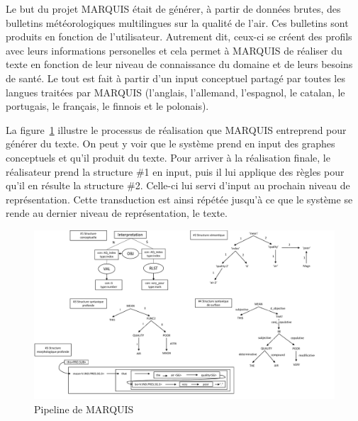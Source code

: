 Le but du projet MARQUIS était de générer, à partir de données brutes, des bulletins météorologiques multilingues sur la qualité de l'air. Ces bulletins sont produits en fonction de l'utilisateur. Autrement dit, ceux-ci se créent des profils avec leurs informations personelles et cela permet à MARQUIS de réaliser du texte en fonction de leur niveau de connaissance du domaine et de leurs besoins de santé. Le tout est fait à partir d'un input conceptuel partagé par toutes les langues traitées par MARQUIS (l'anglais, l'allemand, l'espagnol, le catalan, le portugais, le français, le finnois et le polonais). 

La figure~\ref{fig:marquis} illustre le processus de réalisation que MARQUIS entreprend pour générer du texte. On peut y voir que le système prend en input des graphes conceptuels et qu'il produit du texte. Pour arriver à la réalisation finale, le réalisateur prend la structure \#1 en input, puis il lui applique des règles pour qu'il en résulte la structure \#2. Celle-ci lui servi d'input au prochain niveau de représentation. Cette transduction est ainsi répétée jusqu'à ce que le système se rende au dernier niveau de représentation, le texte.

\begin{figure}[htb]
	\centering
	\includegraphics[width=1\textwidth, trim = {0cm 0cm 0cm 0cm},clip]{ch2/figs/marquis.pdf}
	\caption{Pipeline de MARQUIS \citep{WannerMARQUISGENERATIONUSERTAILORED2010}}
	\label{fig:marquis}
\end{figure}

